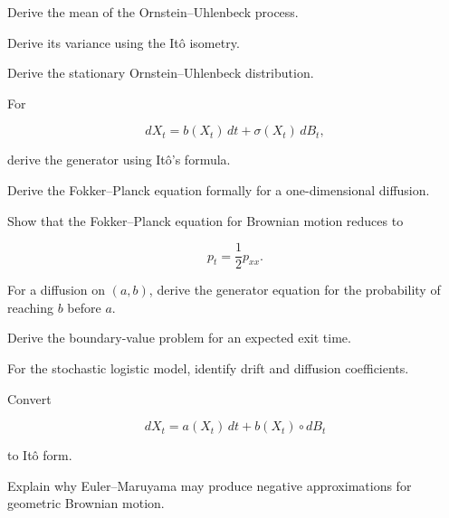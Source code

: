 \begin{exercise}[3]
Derive the mean of the Ornstein--Uhlenbeck process.
\end{exercise}

\begin{exercise}[3]
Derive its variance using the It\^o isometry.
\end{exercise}

\begin{exercise}[3]
Derive the stationary Ornstein--Uhlenbeck distribution.
\end{exercise}

\begin{exercise}[3]
For

\[
dX_t
=
b(X_t)\,dt
+
\sigma(X_t)\,dB_t,
\]

derive the generator using It\^o's formula.
\end{exercise}

\begin{exercise}[3]
Derive the Fokker--Planck equation formally for a one-dimensional
diffusion.
\end{exercise}

\begin{exercise}[3]
Show that the Fokker--Planck equation for Brownian motion reduces to

\[
p_t
=
\frac12p_{xx}.
\]
\end{exercise}

\begin{exercise}[3]
For a diffusion on \((a,b)\), derive the generator equation for the
probability of reaching \(b\) before \(a\).
\end{exercise}

\begin{exercise}[3]
Derive the boundary-value problem for an expected exit time.
\end{exercise}

\begin{exercise}[3]
For the stochastic logistic model, identify drift and diffusion
coefficients.
\end{exercise}

\begin{exercise}[3]
Convert

\[
dX_t
=
a(X_t)\,dt
+
b(X_t)\circ dB_t
\]

to It\^o form.
\end{exercise}

\begin{exercise}[3]
Explain why Euler--Maruyama may produce negative approximations for
geometric Brownian motion.
\end{exercise}

